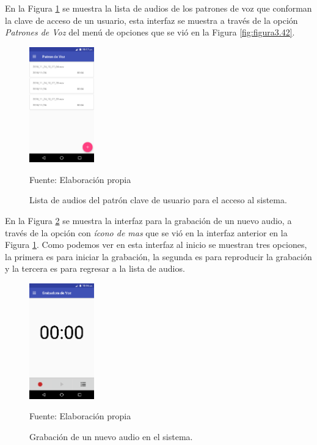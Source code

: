 En la Figura \ref{fig:figura3.43} se muestra la lista de audios de los patrones de voz que conforman la clave de acceso de un usuario, esta interfaz se muestra a través de la opción \textit{Patrones de Voz} del menú de opciones que se vió en la Figura \ref{fig:figura3.42}.
\begin{figure}[H]
\captionsetup{justification=centering}
\begin{center}
\includegraphics[width=0.25\textwidth]{Imagenes/Cap3/image043}
\end{center}
\begin{center}
\vskip -0.5cm
\caption{\small{Lista de audios del patrón clave de usuario para el acceso al sistema.}}
\label{fig:figura3.43}
{\small{Fuente: Elaboración propia}}
\end{center}
\end{figure}

En la Figura \ref{fig:figura3.44} se muestra la interfaz para la grabación de un nuevo audio, a través de la opción con \textit{ícono de mas} que se vió en la interfaz anterior en la Figura \ref{fig:figura3.43}. Como podemos ver en esta interfaz al inicio se muestran tres opciones, la primera es para iniciar la grabación, la segunda es para reproducir la grabación y la tercera es para regresar a la lista de audios.
\begin{figure}[H]
\captionsetup{justification=centering}
\begin{center}
\includegraphics[width=0.25\textwidth]{Imagenes/Cap3/image044}
\end{center}
\begin{center}
\vskip -0.5cm
\caption{\small{Grabación de un nuevo audio en el sistema.}}
\label{fig:figura3.44}
{\small{Fuente: Elaboración propia}}
\end{center}
\end{figure}

